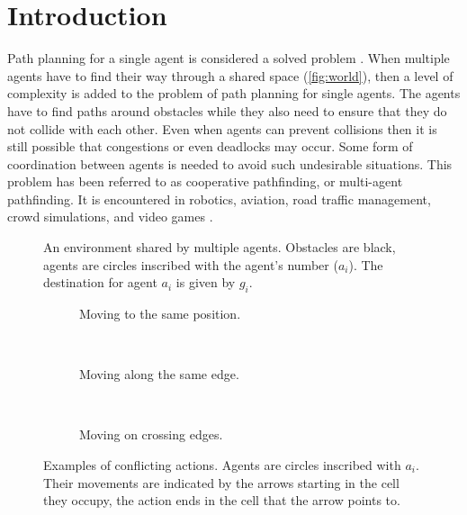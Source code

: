 \section{Introduction}\label{sec:intro}
Path planning for a single agent is considered a solved problem
\cite{sharon2013}. When multiple agents have to find their way through a
shared
space (\autoref{fig:world}), then a level of complexity is added to the problem 
of path planning for single agents. The agents have to find paths
around obstacles while they also need to ensure that they do not collide with
each other. Even when agents can prevent collisions then it is still possible
that congestions or even deadlocks may occur. Some form of coordination between 
agents is needed to avoid such undesirable situations. This problem has been 
referred to as cooperative pathfinding, or multi-agent pathfinding. It is 
encountered in robotics, aviation, road traffic management, crowd simulations, 
and video games \cite{standley2011}.

\begin{figure}[t]
    \centering
    \def\svgscale{.5}
    
    \caption{An environment shared by multiple agents. Obstacles are black,
        agents are circles inscribed with the agent's number ($a_i$). The 
        destination for agent $a_i$ is given by $g_i$.}
    \label{fig:world}
\end{figure}

\begin{figure}[t]
    \centering
    \begin{subfigure}[b]{.18\textwidth}
        \centering
        \def\svgscale{.5}
        
        \caption{Moving to the same position.}
        \label{fig:conflict-position}
    \end{subfigure}
    ~
    \begin{subfigure}[b]{.13\textwidth}
        \centering
        \def\svgscale{.5}
        
        \caption{Moving along the same edge.}
        \label{fig:conflict-same}
    \end{subfigure}
    ~
    \begin{subfigure}[b]{.13\textwidth}
        \centering
        \def\svgscale{.5}
        
        \caption{Moving on crossing edges.}
        \label{fig:conflict-crossing}
    \end{subfigure}
    \caption{Examples of conflicting actions. Agents are circles inscribed with
        $a_i$. Their movements are indicated by the arrows starting in the cell
        they occupy, the action ends in the cell that the arrow points to.}
    \label{fig:conflicts}
\end{figure}

